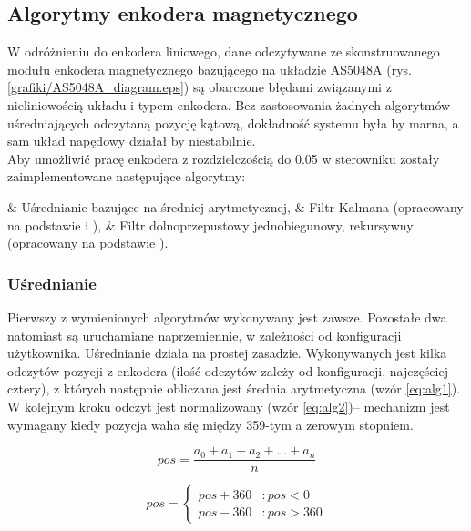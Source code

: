 \subsection{Algorytmy enkodera magnetycznego}

W odróżnieniu do enkodera liniowego, dane odczytywane ze skonstruowanego modułu enkodera magnetycznego bazującego na układzie AS5048A (rys. \ref{grafiki/AS5048A_diagram.eps}) są obarczone błędami związanymi z nieliniowością układu i typem enkodera. Bez zastosowania żadnych algorytmów uśredniających odczytaną pozycję kątową, dokładność systemu była by marna, a sam układ napędowy działał by niestabilnie. \\

Aby umożliwić pracę enkodera z rozdzielczością do 0.05\degree{} w sterowniku zostały zaimplementowane następujące algorytmy:

\begin{easylist}
	& Uśrednianie bazujące na średniej arytmetycznej,
	& Filtr Kalmana (opracowany na podstawie \cite{kalman} i \cite{forbot}),
	& Filtr dolnoprzepustowy jednobiegunowy, rekursywny (opracowany na podstawie \cite{smith}).
	\\
\end{easylist} 

\subsubsection{Uśrednianie}

Pierwszy z wymienionych algorytmów wykonywany jest zawsze. Pozostałe dwa natomiast są uruchamiane naprzemiennie, w zależności od konfiguracji użytkownika. Uśrednianie działa na prostej zasadzie. Wykonywanych jest kilka odczytów pozycji z enkodera (ilość odczytów zależy od konfiguracji, najczęściej cztery), z których następnie obliczana jest średnia arytmetyczna (wzór \ref{eq:alg1}). W kolejnym kroku odczyt jest normalizowany (wzór \ref{eq:alg2})-- mechanizm jest wymagany kiedy pozycja waha się między 359-tym a zerowym stopniem.

\begin{equation} \label{eq:alg1}
	pos = \frac{a_0 + a_1 + a_2 + ... + a_n}{n} 
\end{equation}

\begin{equation} \label{eq:alg2}
pos = \left\{
  \begin{array}{ll}
    pos + 360 & : pos < 0 \\
    pos - 360 & : pos > 360
  \end{array}
\right.
\end{equation}

